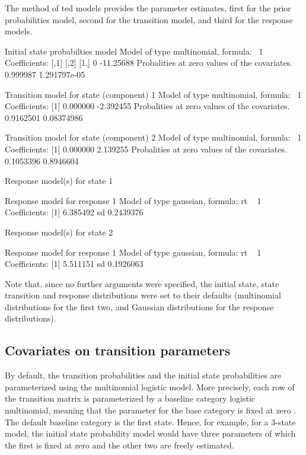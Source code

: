 \documentclass[article]{jss}
\begin{document}
The  method of ted models provides the
parameter estimates, first for the prior probabilities model, second
for the transition model, and third for the response models.
\begin{Schunk}
\begin{Soutput}
Initial state probabilties model 
Model of type multinomial, formula: ~1
Coefficients: 
     [,1]      [,2]
[1,]    0 -11.25688
Probalities at zero values of the covariates.
0.999987 1.291797e-05 

Transition model for state (component) 1 
Model of type multinomial, formula: ~1
Coefficients: 
[1]  0.000000 -2.392455
Probalities at zero values of the covariates.
0.9162501 0.08374986 

Transition model for state (component) 2 
Model of type multinomial, formula: ~1
Coefficients: 
[1] 0.000000 2.139255
Probalities at zero values of the covariates.
0.1053396 0.8946604 


Response model(s) for state 1 

Response model for response 1 
Model of type gaussian, formula: rt ~ 1
Coefficients: 
[1] 6.385492
sd  0.2439376 


Response model(s) for state 2 

Response model for response 1 
Model of type gaussian, formula: rt ~ 1
Coefficients: 
[1] 5.511151
sd  0.1926063 
\end{Soutput}
\end{Schunk}


Note that, since no further arguments were specified, the initial
state, state transition and response distributions were set to their
defaults (multinomial distributions for the first two, and Gaussian
distributions for the response distributions).

\subsection{Covariates on transition parameters}

By default, the transition probabilities and the initial state
probabilities are parameterized using the multinomial logistic model.
More precisely, each row of the transition matrix is parameterized by
a baseline category logistic multinomial, meaning that the parameter
for the base category is fixed at zero \citep[see][p.\ 267 ff., for
multinomial logistic models and various
parameterizations]{Agresti2002}.  The default baseline category is the
first state.  Hence, for example, for a 3-state model, the initial
state probability model would have three parameters of which the first
is fixed at zero and the other two are freely estimated.
\end{document}
